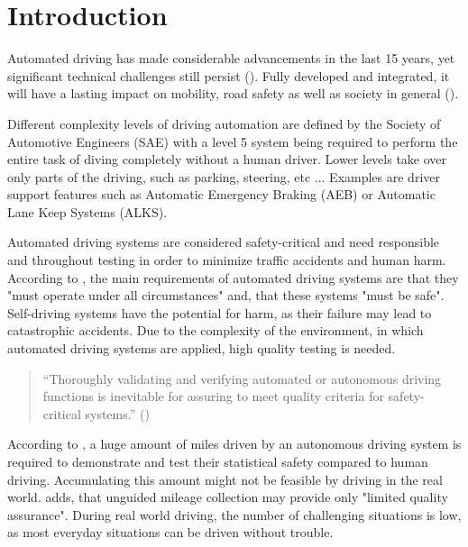 \chapter{Introduction}
Automated driving has made considerable advancements in the last 15 years, yet significant technical challenges still persist (\cite{ayoub_manual_2019}).
Fully developed and integrated, it will have a lasting impact on mobility, road safety as well as society in general (\cite{milakis_policy_2017}).

Different complexity levels of driving automation are defined by the Society of Automotive Engineers (SAE)  with a level 5 system being required to perform the entire task of diving completely without a human driver. Lower levels take over only parts of the driving, such as parking, steering, etc ... Examples are driver support features such as Automatic Emergency Braking (AEB) or Automatic Lane Keep Systems (ALKS).

Automated driving systems are considered safety-critical and need responsible and throughout testing in order to minimize traffic accidents and human harm. According to \cite{kluck_search-based_2022}, the main requirements of automated driving systems are that they "must operate under all circumstances" and, that these systems "must be safe". Self-driving systems have the potential for harm, as their failure may lead to catastrophic accidents. Due to the complexity of the environment, in which automated driving systems are applied, high quality testing is needed. 

\begin{quote}
	\begin{em}
		\enquote{Thoroughly validating and verifying automated or autonomous driving functions is inevitable for assuring to meet quality criteria for safety-critical systems.} (\cite{felbinger_comparing_2019})
	\end{em}
\end{quote}

According to \cite{kalra_driving_2016}, a huge amount of miles driven by an autonomous driving system is required to demonstrate and test their statistical safety compared to human driving. Accumulating this amount might not be feasible by driving in the real world.
\cite{kluck_search-based_2022} adds, that unguided mileage collection may provide only "limited quality assurance". During real world driving, the number of challenging situations is low, as most everyday situations can be driven without trouble.

